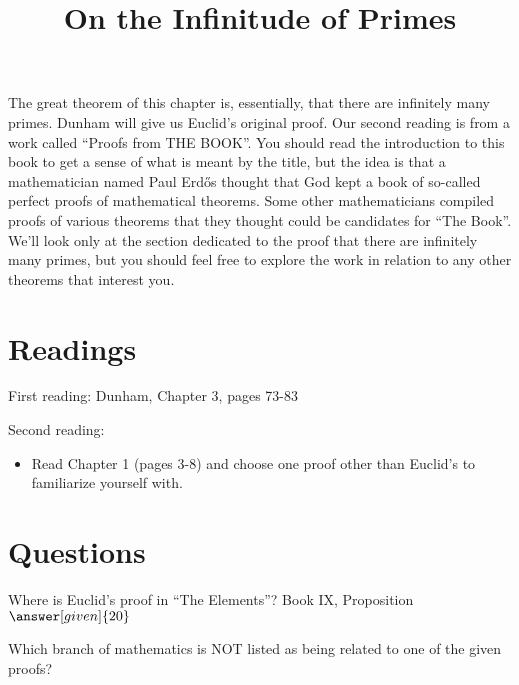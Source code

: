 \documentclass[nooutcomes]{ximera}
\title{On the Infinitude of Primes}
\begin{document}
\begin{abstract}
    
\end{abstract}
\maketitle



The great theorem of this chapter is, essentially, that there are infinitely many primes.  Dunham will give 
us Euclid's original proof. Our second reading is from a work called ``Proofs from THE BOOK''. You should read 
the introduction to this book to get a sense of what is meant by the title, but the idea is that a 
mathematician named Paul Erd\H{o}s thought that God kept a book of so-called perfect proofs of mathematical 
theorems. Some other mathematicians compiled proofs of various theorems that they thought could be candidates 
for ``The Book''. We'll look only at the section dedicated to the proof that there are infinitely many primes, 
but you should feel free to explore the work in relation to any other theorems that interest you.


\section{Readings}
First reading: Dunham, Chapter 3, pages 73-83

Second reading: 
\begin{itemize}
    \item Read Chapter 1 (pages 3-8) and choose one proof other than Euclid's to familiarize yourself with.
\end{itemize}



\section{Questions}

\begin{question}
Where is Euclid's proof in ``The Elements''? Book IX, Proposition $\answer[given]{20}$
\end{question}

\begin{question}
Which branch of mathematics is NOT listed as being related to one of the given proofs?
\begin{multipleChoice}
\end{multipleChoice}
\end{question}


%
\end{document}
